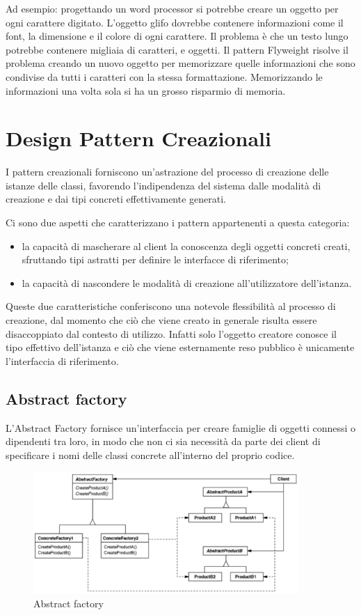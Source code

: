 Ad esempio: progettando un word processor si potrebbe creare un oggetto per ogni carattere digitato. 
L'oggetto glifo dovrebbe contenere informazioni come il font, la dimensione e il colore di ogni carattere. 
Il problema è che un testo lungo potrebbe contenere migliaia di caratteri, e oggetti. Il pattern Flyweight risolve il problema creando un nuovo oggetto per memorizzare quelle informazioni che sono condivise da tutti i caratteri con la stessa formattazione. 
Memorizzando le informazioni una volta sola si ha un grosso risparmio di memoria.

\section{Design Pattern Creazionali}
I pattern creazionali forniscono un'astrazione del processo di creazione delle istanze delle classi, favorendo l'indipendenza del sistema dalle modalità di creazione e dai tipi concreti effettivamente generati.

Ci sono due aspetti che caratterizzano i pattern appartenenti a questa categoria:
\begin{itemize}
	\item la capacità di mascherare al client la conoscenza degli oggetti concreti creati, sfruttando tipi astratti per definire le interfacce di riferimento;
	\item la capacità di nascondere le modalità di creazione all'utilizzatore dell'istanza.
\end{itemize}
Queste due caratteristiche conferiscono una notevole flessibilità al processo di creazione, dal momento che ciò che viene creato in generale risulta essere disaccoppiato dal contesto di utilizzo. 
Infatti solo l'oggetto creatore conosce il tipo effettivo dell'istanza e ciò che viene esternamente reso pubblico è unicamente l'interfaccia di riferimento.

\subsection{Abstract factory}

L'Abstract Factory fornisce un'interfaccia per creare famiglie di oggetti connessi o dipendenti tra loro, in modo che non ci sia necessità da parte dei client di specificare i nomi delle classi concrete all'interno del proprio codice.

\begin{figure}[H]
\includegraphics[width=0.9\textwidth]{res/img/DP/abstractFactory}
\caption{Abstract factory}
\end{figure}

